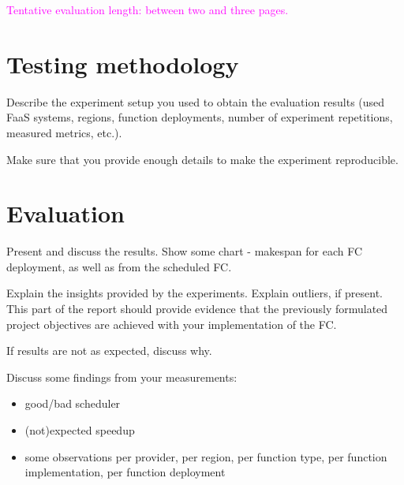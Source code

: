 \textcolor{magenta}{Tentative evaluation length: between two and three pages.}

%
%
%
\section{Testing methodology}

Describe the experiment setup you used to obtain the evaluation results (used FaaS systems, regions, function deployments, number of experiment repetitions, measured metrics, etc.).

Make sure that you provide enough details to make the experiment reproducible.



%
%
%
\section{Evaluation}

Present and discuss the results. Show some chart - makespan for each FC deployment, as well as from the scheduled FC.

Explain the insights provided by the experiments. Explain outliers, if present.
This part of the report should provide evidence that the previously formulated project objectives are achieved with your implementation of the FC.

If results are not as expected, discuss why.

Discuss some findings from your measurements:
\begin{itemize}
    \item good/bad scheduler
    \item (not)expected speedup
    \item some observations per provider, per region, per function type, per function implementation, per function deployment
\end{itemize}
